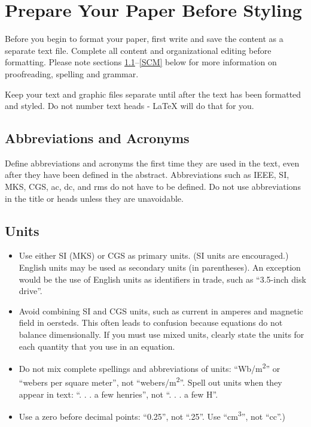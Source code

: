 \documentclass[conference]{IEEEtran}
\begin{document}
\section{Prepare Your Paper Before Styling}
Before you begin to format your paper, first write and save the content as a 
separate text file. Complete all content and organizational editing before 
formatting. Please note sections \ref{AA}--\ref{SCM} below for more information on 
proofreading, spelling and grammar.

Keep your text and graphic files separate until after the text has been 
formatted and styled. Do not number text heads - {\LaTeX} will do that 
for you.

\subsection{Abbreviations and Acronyms}\label{AA}
Define abbreviations and acronyms the first time they are used in the text, 
even after they have been defined in the abstract. Abbreviations such as 
IEEE, SI, MKS, CGS, ac, dc, and rms do not have to be defined. Do not use 
abbreviations in the title or heads unless they are unavoidable.

\subsection{Units}
\begin{itemize}
\item Use either SI (MKS) or CGS as primary units. (SI units are encouraged.) English units may be used as secondary units (in parentheses). An exception would be the use of English units as identifiers in trade, such as ``3.5-inch disk drive''.
\item Avoid combining SI and CGS units, such as current in amperes and magnetic field in oersteds. This often leads to confusion because equations do not balance dimensionally. If you must use mixed units, clearly state the units for each quantity that you use in an equation.
\item Do not mix complete spellings and abbreviations of units: ``Wb/m\textsuperscript{2}'' or ``webers per square meter'', not ``webers/m\textsuperscript{2}''. Spell out units when they appear in text: ``. . . a few henries'', not ``. . . a few H''.
\item Use a zero before decimal points: ``0.25'', not ``.25''. Use ``cm\textsuperscript{3}'', not ``cc''.)
\end{itemize}
\end{document}
